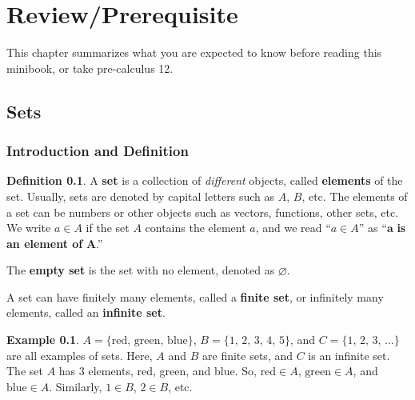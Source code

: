 \documentclass[
]{book}
\theoremstyle{definition}
\newtheorem{definition}{Definition}[chapter]
\theoremstyle{definition}
\newtheorem{example}{Example}[chapter]
\theoremstyle{definition}
\theoremstyle{definition}
\theoremstyle{remark}
\begin{document}
\hypertarget{reviewprerequisite}{%
\chapter*{Review/Prerequisite}\label{reviewprerequisite}}

This chapter summarizes what you are expected to know before reading this minibook, or take pre-calculus 12.

\hypertarget{sets}{%
\section{Sets}\label{sets}}

\hypertarget{introduction-and-definition}{%
\subsection{Introduction and Definition}\label{introduction-and-definition}}

\begin{definition}
\protect\hypertarget{def:set}{}\label{def:set}A \textbf{set} is a collection of \emph{different} objects, called \textbf{elements} of the set. Usually, sets are denoted by capital letters such as \(A\), \(B\), etc. The elements of a set can be numbers or other objects such as vectors, functions, other sets, etc. We write \(a \in A\) if the set \(A\) contains the element \(a\), and we read ``\(a \in A\)'' as ``\(\boldsymbol{a}\) \textbf{is an element of} \(\boldsymbol{A}\).''
\end{definition}

The \textbf{empty set} is the set with no element, denoted as \(\varnothing\).

A set can have finitely many elements, called a \textbf{finite set}, or infinitely many elements, called an \textbf{infinite set}.

\begin{example}
\protect\hypertarget{exm:roster}{}\label{exm:roster}\(A = \{\text{red},\, \text{green},\, \text{blue}\}\), \(B = \{1,\,2,\,3,\,4,\,5\}\), and \(C = \{1,\,2,\,3,\,\dots\}\) are all examples of sets. Here, \(A\) and \(B\) are finite sets, and \(C\) is an infinite set.\\
The set \(A\) has 3 elements, red, green, and blue. So, \(\text{red} \in A\), \(\text{green} \in A\), and \(\text{blue} \in A\). Similarly, \(1 \in B\), \(2 \in B\), etc.
\end{example}
\end{document}
